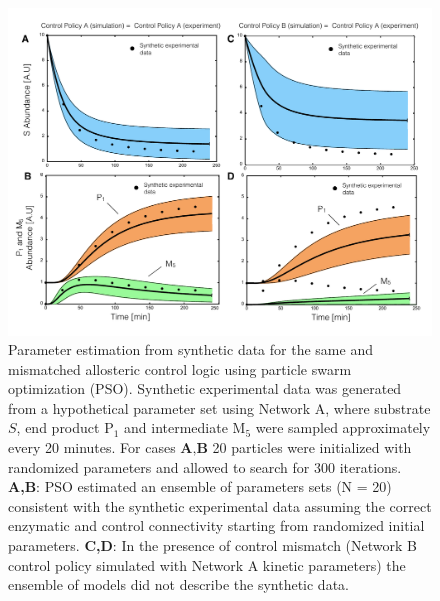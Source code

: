 \documentclass[12pt]{article}
\begin{document}
\clearpage

\begin{figure}
\centering
\includegraphics[width=1.0\textwidth]{./figs/Figure-5-ParameterFit.pdf}
\caption{Parameter estimation from synthetic data for the same and mismatched allosteric control logic using particle swarm optimization (PSO). 
Synthetic experimental data was generated from a hypothetical parameter set using Network A, 
where substrate $S$, end product P$_{1}$ and intermediate M$_5$ were sampled approximately every 20 minutes. 
For cases $\textbf{A,B}$ 20 particles were initialized with randomized parameters and allowed to search for 300 iterations. 
\textbf{A,B}: PSO estimated an ensemble of parameters sets (N = 20) consistent with the synthetic experimental data assuming the correct
enzymatic and control connectivity starting from randomized initial parameters.
\textbf{C,D}: In the presence of control mismatch (Network B control policy simulated with Network A kinetic parameters) 
the ensemble of models did not describe the synthetic data. 
}\label{fig-parameter-fit}
\end{figure}

\clearpage
\end{document}
